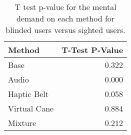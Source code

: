 
\begin{table}[!htb]
\centering
\caption{T test p-value for the mental demand on each method for blinded users versus sighted users.}
\label{tab:ttest_mental_demand}
\begin{tabular}{lr}
\toprule
      Method &  T-Test P-Value \\
\midrule
        Base &           0.322 \\
       Audio &           0.000 \\
 Haptic Belt &           0.058 \\
Virtual Cane &           0.884 \\
     Mixture &           0.212 \\
\bottomrule
\end{tabular}
\end{table}

